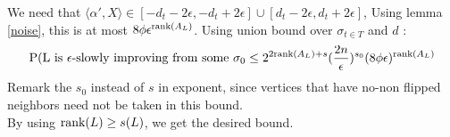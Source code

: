 We need that $ \langle\alpha ', X \rangle \in [- d_t -2\epsilon, -d_t + 2\epsilon] \cup [d_t - 2\epsilon, d_t + 2\epsilon]$, Using lemma \ref{noise}, this is at most $8\phi\epsilon^{\text{rank}(A_L)}$. Using union bound over $\sigma_{t \in T}$ and $d$ :
\begin{equation*}
\text{P(L is }\epsilon\text{-slowly improving from some }\sigma_0 \leq 2^{2\text{rank}(A_L) + s}(\frac{2n}{\epsilon})^{s_0}(8\phi\epsilon)^{\text{rank}(A_L)}
\end{equation*}
Remark the $s_0$ instead of $s$ in exponent, since vertices that have no-non flipped neighbors need not be taken in this bound. \\
By using  $\text{rank}(L) \geq s(L)$, we get the desired bound. \\